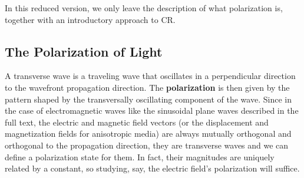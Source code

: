 \documentclass[11pt, a4paper, twoside]{article} %
\begin{document}
In this reduced version, we only leave the description of what polarization is, together with an introductory approach to CR.


\subsection*{The Polarization of Light}
A transverse wave is a traveling wave that oscillates in a perpendicular direction to the wavefront propagation direction. The {\bf polarization} is then given by the pattern shaped by the transversally oscillating component of the wave. Since in the case of electromagnetic waves like the sinusoidal plane waves described in the full text, the electric and magnetic field vectors (or the displacement and magnetization fields for anisotropic media) are always mutually orthogonal and orthogonal to the propagation direction, they are transverse waves and we can define a polarization state for them. In fact, their magnitudes are uniquely related by a constant, so studying, say, the electric field's polarization will suffice.
\end{document}
